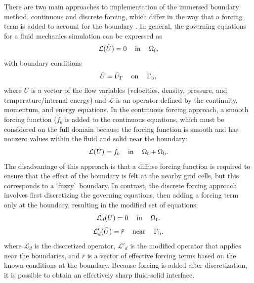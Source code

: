 \documentclass{article}
\begin{document}
There are two main approaches to implementation of the immersed boundary method, continuous and discrete forcing, which differ in the way that a forcing term is added to account for the boundary \cite{mittal2005}. In general, the governing equations for a fluid mechanics simulation can be expressed as
\begin{equation}
\mathcal{L}(\bar{U}) = 0 \hspace{12pt} \rm{in} \hspace{12pt}  \Omega_f,
\end{equation}
with boundary conditions
\begin{equation}
\bar{U} = \bar{U}_\Gamma \hspace{12pt} \rm{on} \hspace{12pt}  \Gamma_b,
\end{equation}
where $\bar{U}$ is a vector of the flow variables (velocities, density, pressure, and temperature/internal energy) and $\mathcal{L}$ is an operator defined by the continuity, momentum, and energy equations. In the continuous forcing approach, a smooth forcing function ($\bar{f}_b$ is added to the continuous equations, which must be considered on the full domain because the forcing function is smooth and has nonzero values within the fluid and solid near the boundary:
\begin{equation}
\mathcal{L}(\bar{U}) = \bar{f}_b \hspace{12pt} \rm{in} \hspace{12pt}  \Omega_f + \Omega_b.
\end{equation}
The disadvantage of this approach is that a diffuse forcing function is required to ensure that the effect of the boundary is felt at the nearby grid cells, but this corresponds to a \lq fuzzy\rq\ boundary. In contrast, the discrete forcing approach involves first discretizing the governing equations, then adding a forcing term only at the boundary, resulting in the modified set of equations:
\begin{equation}
\mathcal{L}_d(\bar{U}) = 0 \hspace{12pt} \rm{in} \hspace{12pt}  \Omega_f.
\end{equation}
\begin{equation}
\mathcal{L}'_d(\bar{U}) = \bar{r} \hspace{12pt} \rm{near} \hspace{12pt}  \Gamma_b.
\end{equation}
where $\mathcal{L}_d$ is the discretized operator, $\mathcal{L}'_d$ is the modified operator that applies near the boundaries, and $\bar{r}$ is a vector of effective forcing terms based on the known conditions at the boundary. Because forcing is added after discretization, it is possible to obtain an effectively sharp fluid-solid interface.\\
\end{document}
